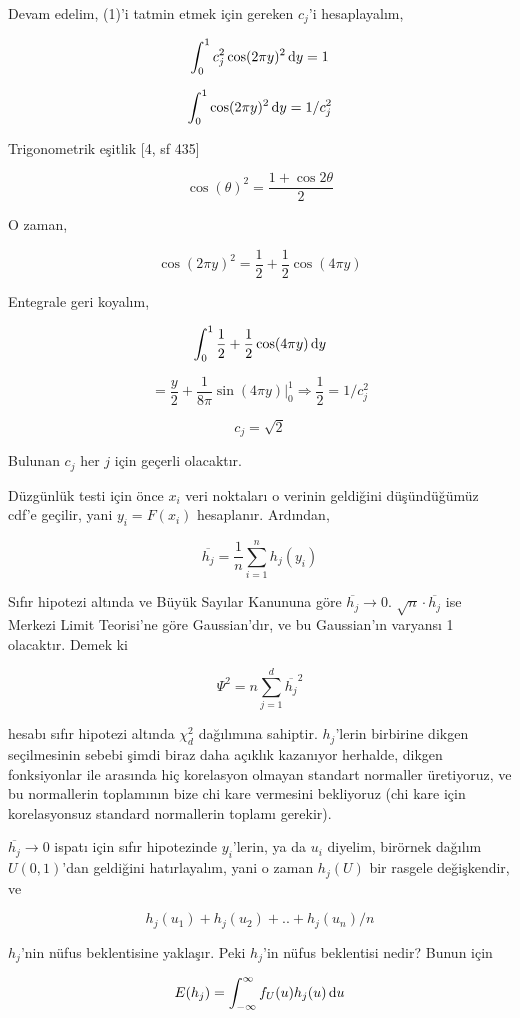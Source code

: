 \documentclass[12pt,fleqn]{article}\usepackage{../../common}
\begin{document}
Devam edelim, (1)'i tatmin etmek için gereken $c_j$'i hesaplayalım,

$$ 
\int _{0}^{1} c_j^2 \cos(2 \pi y)^2 \,\mathrm{d} y = 1
$$

$$ 
\int _{0}^{1}\cos(2 \pi y)^2 \,\mathrm{d} y = 1/c_j^2 
$$


Trigonometrik eşitlik [4, sf 435]

$$ \cos(\theta)^2 = \frac{1 + \cos 2 \theta }{2}$$

O zaman,

$$ 
 \cos(2 \pi y)^2 = \frac{1}{2} + \frac{1}{2}\cos(4 \pi y)
 $$

Entegrale geri koyalım,

$$ 
\int _{0}^{1} \frac{1}{2} + \frac{1}{2}\cos(4 \pi y) \,\mathrm{d} y
$$

$$ 
= \frac{y}{2} + \frac{1}{8\pi}\sin(4 \pi y)  \bigg|_{0}^{1} 
\Rightarrow \frac{1}{2} = 1/c_j^2
$$

$$ c_j = \sqrt{2} $$

Bulunan $c_j$ her $j$ için geçerli olacaktır.

Düzgünlük testi için önce $x_i$ veri noktaları o verinin geldiğini
düşündüğümüz cdf'e geçilir, yani $y_i = F(x_i)$ hesaplanır. Ardından,

$$ \overline{h_j} = \frac{1}{n} \sum _{i=1}^{n} h_j(y_i) $$

Sıfır hipotezi altında ve Büyük Sayılar Kanununa göre $\overline{h_j} \to0$.  
$\sqrt{n} \cdot \overline{h_j}$ ise Merkezi Limit Teorisi'ne göre Gaussian'dır, 
ve bu Gaussian'ın varyansı  1 olacaktır. Demek ki

$$ 
\Psi^2 = n \sum _{j=1}^{d} \overline{h_j}^2
$$

hesabı sıfır hipotezi altında $\chi^2_d$ dağılımına sahiptir. $h_j$'lerin
birbirine dikgen seçilmesinin sebebi şimdi biraz daha açıklık kazanıyor
herhalde, dikgen fonksiyonlar ile arasında hiç korelasyon olmayan standart
normaller üretiyoruz, ve bu normallerin toplamının bize chi kare vermesini
bekliyoruz (chi kare için korelasyonsuz standard normallerin toplamı
gerekir).

$\overline{h_j} \to 0$ ispatı için sıfır hipotezinde $y_i$'lerin, ya da
$u_i$ diyelim, birörnek dağılım $U(0,1)$'dan geldiğini hatırlayalım, yani o
zaman $h_j(U)$ bir rasgele değişkendir, ve

$$ h_j(u_1) + h_j(u_2) + .. + h_j(u_n) / n $$

$h_j$'nin nüfus beklentisine yaklaşır. Peki $h_j$'in nüfus beklentisi
nedir? Bunun için 

$$ E(h_j) = \int _{-\infty}^{\infty} f_U(u)h_j(u) \,\mathrm{d} u $$
\end{document}
